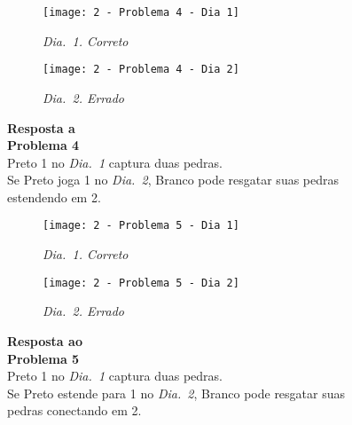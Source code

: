 \begin{SCfigure}[][h!]
    \begin{subfigure}[t]{.31\textwidth}
        \texttt{[image: 2 - Problema 4 - Dia 1]}
        \caption*{\emph{Dia.\@~1. Correto}}
    \end{subfigure}
    \hfill
    \begin{subfigure}[t]{.31\textwidth}
        \texttt{[image: 2 - Problema 4 - Dia 2]}
        \caption*{\emph{Dia.\@~2. Errado}}
    \end{subfigure}
    \hfill
    \caption*{\textbf{Resposta a\\Problema 4}\\\vspace*{.25cm}Preto 1 no \emph{Dia.\@~1} captura duas pedras.\\\vspace*{.25cm}Se Preto joga 1 no \emph{Dia.\@~2}, Branco pode resgatar suas pedras estendendo em 2.}
\end{SCfigure}

\vfill

\begin{SCfigure}[][h!]
    \begin{subfigure}[t]{.31\textwidth}
        \texttt{[image: 2 - Problema 5 - Dia 1]}
        \caption*{\emph{Dia.\@~1. Correto}}
    \end{subfigure}
    \hfill
    \begin{subfigure}[t]{.31\textwidth}
        \texttt{[image: 2 - Problema 5 - Dia 2]}
        \caption*{\emph{Dia.\@~2. Errado}}
    \end{subfigure}
    \hfill
    \caption*{\textbf{Resposta ao\\Problema 5}\\\vspace*{.25cm}Preto 1 no \emph{Dia.\@~1} captura duas pedras.\\\vspace*{.25cm}Se Preto estende para 1 no \emph{Dia.\@~2}, Branco pode resgatar suas pedras conectando em 2.}
\end{SCfigure}

\vfill

